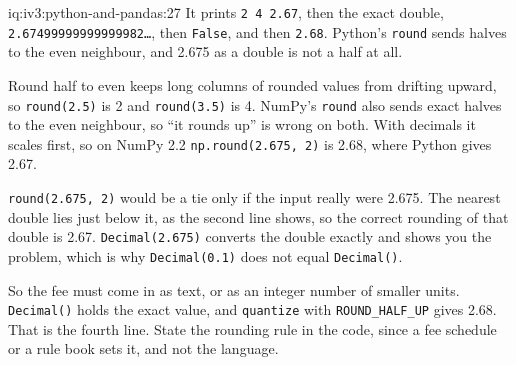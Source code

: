 \begin{solution}{iq:iv3:python-and-pandas:27}
It prints \texttt{2 4 2.67}, then the exact double, \texttt{2.67499999999999982\dots}, then \texttt{False}, and then \texttt{2.68}. Python's \texttt{round} sends halves to the even neighbour, and 2.675 as a double is not a half at all.

Round half to even keeps long columns of rounded values from drifting upward, so \texttt{round(2.5)} is 2 and \texttt{round(3.5)} is 4. NumPy's \texttt{round} also sends exact halves to the even neighbour, so ``it rounds up'' is wrong on both. With decimals it scales first, so on NumPy 2.2 \texttt{np.round(2.675, 2)} is 2.68, where Python gives 2.67.

\texttt{round(2.675, 2)} would be a tie only if the input really were 2.675. The nearest double lies just below it, as the second line shows, so the correct rounding of that double is 2.67. \texttt{Decimal(2.675)} converts the double exactly and shows you the problem, which is why \texttt{Decimal(0.1)} does not equal \texttt{Decimal(\textquotesingle)}.

So the fee must come in as text, or as an integer number of smaller units. \texttt{Decimal(\textquotesingle)} holds the exact value, and \texttt{quantize} with \texttt{ROUND\_HALF\_UP} gives 2.68. That is the fourth line. State the rounding rule in the code, since a fee schedule or a rule book sets it, and not the language.

\end{solution}

